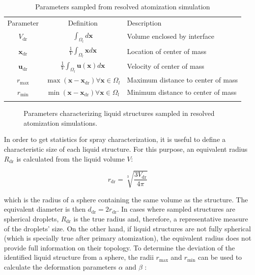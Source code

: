 \begin{table}[!h]
\centering
\caption{Parameters sampled from resolved atomization simulation}
\begin{tabular}{ccl}
\thickhline
Parameter & Definition & Description \\
\thickhline
$V_\mathrm{dr}$ & $\displaystyle \int_{\Omega_l} d \textbf{x}$ & Volume enclosed by interface  \\
\hline
$\textbf{x}_\mathrm{dr}$ & $\displaystyle \frac{1}{V} \int_{\Omega_l} \boldsymbol{x} d \textbf{x}$ &   Location of center of mass \\
\hline
$\textbf{u}_\mathrm{dr}$ & $\displaystyle \frac{1}{V} \int_{\Omega_l} \textbf{u} \left( \boldsymbol{x} \right) d \textbf{x}$ & Velocity of center of mass  \\
\hline
$r_\mathrm{max}$ & $\displaystyle \max \left( \textbf{x} - \textbf{x}_\mathrm{dr}  \right) \forall \textbf{x} \in \Omega_l$ & Maximum distance to center of mass \\
\hline
$r_\mathrm{min}$ & $\displaystyle \min \left( \textbf{x} - \textbf{x}_\mathrm{dr}  \right) \forall \textbf{x} \in \Omega_l$ & Minimum distance to center of mass \\
\thickhline
\end{tabular}
\label{tab:sampling_parameters}
\end{table}

\begin{figure}[h!]	
	\centering
	\caption{Parameters characterizing liquid structures sampled in resolved atomization simulations. }
	\label{fig:droplet_sampling_parameters}
\end{figure}

In order to get statistics for spray characterization, it is useful to define a characteristic size of each liquid structure. For this purpose, an equivalent radius $R_\mathrm{dr}$ is calculated from the liquid volume $V$:

\begin{equation}
r_\mathrm{dr} = \sqrt[3]{\frac{3 V_\mathrm{dr}}{4 \pi}}
\end{equation}

which is the radius of a sphere containing the same volume as the structure. The equivalent diameter is then $d_\mathrm{dr} = 2 r_\mathrm{dr}$. In cases where sampled structures are spherical droplets, $R_\mathrm{dr}$ is the true radius and, therefore, a representative measure of the droplets' size. On the other hand, if liquid structures are not fully spherical (which is specially true after primary atomization), the equivalent radius does not provide full information on their topology. To determine the deviation of the identified liquid structure from a sphere, the radii $r_\mathrm{max}$ and $r_\mathrm{min}$ can be used to calculate the deformation parameters $\alpha$ and $\beta$ :

